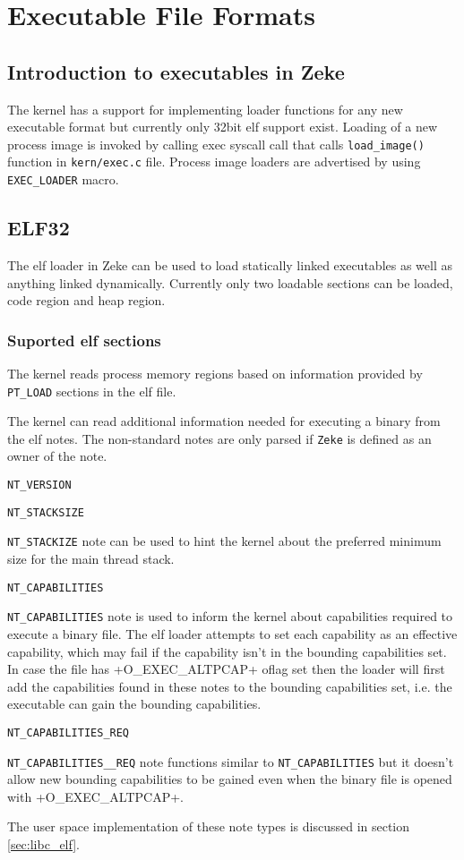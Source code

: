 \chapter{Executable File Formats}
\label{chap:exec}

\section{Introduction to executables in Zeke}

The kernel has a support for implementing loader functions for any new
executable format but currently only 32bit \acf{elf} support exist.
Loading of a new process image is invoked by calling exec syscall call that
calls \verb+load_image()+ function in \verb+kern/exec.c+ file.
Process image loaders are advertised by using \verb+EXEC_LOADER+ macro.

\section{ELF32}

The \acs{elf} loader in Zeke can be used to load statically linked executables
as well as anything linked dynamically. Currently only two loadable sections can
be loaded, code region and heap region.

\subsection{Suported \acs{elf} sections}

The kernel reads process memory regions based on information provided by
\verb+PT_LOAD+ sections in the \acs{elf} file.

The kernel can read additional information needed for executing a binary
from the elf notes. The non-standard notes are only parsed if \verb+Zeke+
is defined as an owner of the note.

\verb+NT_VERSION+

\verb+NT_STACKSIZE+

\verb+NT_STACKIZE+ note can be used to hint the kernel about the preferred
minimum size for the main thread stack.

\verb+NT_CAPABILITIES+

\verb+NT_CAPABILITIES+ note is used to inform the kernel about capabilities
required to execute a binary file. The elf loader attempts to set each
capability as an effective capability, which may fail if the capability
isn't in the bounding capabilities set. In case the file has
\ver+O_EXEC_ALTPCAP+ oflag set then the loader will first add the capabilities
found in these notes to the bounding capabilities set, i.e. the executable
can gain the bounding capabilities.

\verb+NT_CAPABILITIES_REQ+

\verb+NT_CAPABILITIES__REQ+ note functions similar to  \verb+NT_CAPABILITIES+
but it doesn't allow new bounding capabilities to be gained even when the
binary file is opened with \ver+O_EXEC_ALTPCAP+.

The user space implementation of these note types is discussed in section
\ref{sec:libc_elf}.
